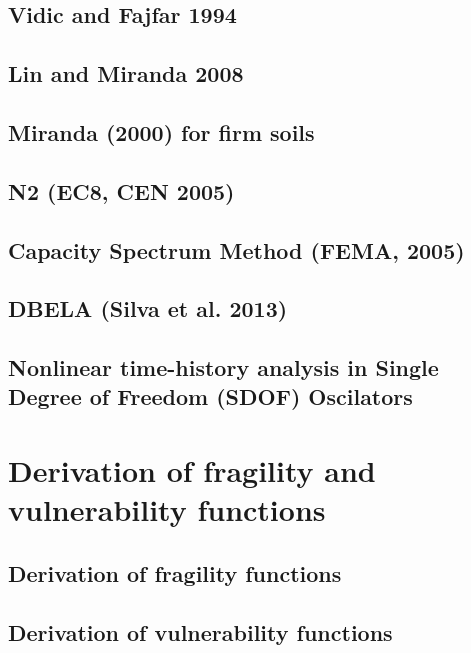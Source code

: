 		\subsection{Vidic and Fajfar 1994}
		\label{subsec:VidicEtAl1994}
		
		
		\subsection{Lin and Miranda 2008}
		\label{subsec:LinMiranda2008}
		
	
		\subsection{Miranda (2000) for firm soils}
		\label{subsec:Miranda}
		
		
		\subsection{N2 (EC8, CEN 2005)}
		\label{subsec:N2}
		
	
		\subsection{Capacity Spectrum Method (FEMA, 2005)}
		\label{subsec:CSM}
		
		
		\subsection{DBELA (Silva et al. 2013)}
		\label{subsec:DBELA_Silva2013}
		
		
		\subsection{Nonlinear time-history analysis in Single Degree of Freedom (SDOF) Oscilators}
		\label{subsec:NLTHA_SDOF}
		
		
	\section{Derivation of fragility and vulnerability functions}
	\label{sec:derive_fragility}
	
			
		\subsection{Derivation of fragility functions}
		\label{subsec:derive_fragility}
		
		
		\subsection{Derivation of vulnerability functions}
		\label{subsec:derive_vulnerability}
		